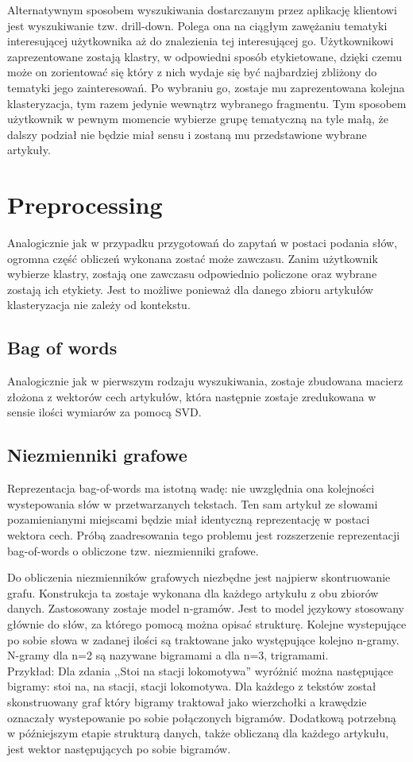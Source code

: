 Alternatywnym sposobem wyszukiwania dostarczanym
 przez aplikację klientowi jest wyszukiwanie tzw. drill-down. 
 Polega ona na ciągłym zawężaniu tematyki interesującej
 użytkownika aż do znalezienia tej interesującej go.
Użytkownikowi zaprezentowane zostają klastry, w odpowiedni sposób etykietowane, dzięki czemu może on zorientować się który z nich wydaje się być najbardziej zbliżony do tematyki jego zainteresowań. Po wybraniu go, zostaje mu zaprezentowana kolejna klasteryzacja, tym razem jedynie wewnątrz wybranego fragmentu. Tym sposobem użytkownik w pewnym momencie wybierze grupę tematyczną na tyle małą, że dalszy podział nie będzie miał sensu i zostaną mu przedstawione wybrane artykuły.

\section{Preprocessing}
Analogicznie jak w przypadku przygotowań do zapytań w postaci podania słów, ogromna część obliczeń wykonana zostać może zawczasu. Zanim użytkownik wybierze klastry, zostają one zawczasu odpowiednio policzone oraz wybrane zostają ich etykiety. Jest to możliwe ponieważ dla danego zbioru artykułów klasteryzacja nie zależy od kontekstu.

\subsection{Bag of words}
Analogicznie jak w pierwszym rodzaju wyszukiwania, zostaje zbudowana macierz złożona z wektorów cech artykułów, która następnie zostaje zredukowana w sensie ilości wymiarów za pomocą SVD.

\subsection{Niezmienniki grafowe}
Reprezentacja bag-of-words ma istotną wadę: nie uwzględnia ona kolejności wystepowania słów w przetwarzanych tekstach. Ten sam artykuł ze słowami pozamienianymi miejscami będzie miał identyczną reprezentację w postaci wektora cech. Próbą zaadresowania tego problemu jest rozszerzenie reprezentacji bag-of-words o obliczone tzw. niezmienniki grafowe. 

Do obliczenia niezmienników grafowych niezbędne jest najpierw skontruowanie grafu. Konstrukcja ta zostaje wykonana dla każdego artykułu z obu zbiorów danych. Zastosowany zostaje model n-gramów. Jest to model językowy stosowany głównie do słów, za którego pomocą można opisać strukturę. Kolejne wystepujące po sobie słowa w zadanej ilości są traktowane jako występujące kolejno n-gramy. N-gramy dla n=2 są nazywane bigramami a dla n=3, trigramami.\\
Przykład: Dla zdania ,,Stoi na stacji lokomotywa'' wyróżnić można następujące bigramy: stoi na, na stacji, stacji lokomotywa. Dla każdego z tekstów został skonstruowany graf który bigramy traktował jako wierzchołki a krawędzie oznaczały wystepowanie po sobie połączonych bigramów. Dodatkową potrzebną w późniejszym etapie strukturą danych, także obliczaną dla każdego artykułu, jest wektor następujących po sobie bigramów.


